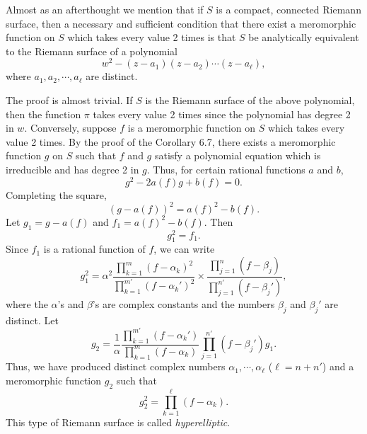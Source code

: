 \documentclass[a4paper,11pt]{article}
\begin{document}
Almost as an afterthought we mention that if $S$ is a compact,
connected Riemann surface, then a necessary and sufficient condition
that there exist a meromorphic function on $S$ which takes every value
2 times is that $S$ be analytically equivalent to the Riemann surface
of a polynomial
$$
w^2 - (z-a_1)(z-a_2) \cdots (z-a_\ell),
$$
where $a_1, a_2, \cdots, a_\ell$ are distinct.

The proof is almost trivial.  If $S$ is the Riemann surface of the
above polynomial, then the function $\pi$ takes every value 2 times
since the polynomial has degree 2 in $w$.  Conversely, suppose $f$ is
a meromorphic function on $S$ which takes every value 2 times.  By the
proof of the Corollary 6.7, there exists a meromorphic function $g$ on
$S$ such that $f$ and $g$ satisfy a polynomial equation which is
irreducible and has degree 2 in $g$.  Thus, for certain rational
functions $a$ and $b$,
$$
g^2 - 2a(f)g + b(f) = 0.
$$
Completing the square,
$$
(g - a(f))^2 = a(f)^2 - b(f).
$$
Let $g_1 = g - a(f)$ and $f_1 = a(f)^2 - b(f)$.  Then
$$
g_1^2 = f_1.
$$
Since $f_1$ is a rational function of $f$, we can write
$$
g_1^2 = \alpha^2 \frac{\prod_{k=1}^m (f - \alpha_k)^2}{
  \prod_{k=1}^{m'} (f - \alpha_k')^2}
  \times \frac{\prod_{j=1}^n (f - \beta_j)}{
    \prod_{j=1}^{n'} (f - \beta_j')},
$$
where the $\alpha$'s and $\beta$'s are complex constants and the
numbers $\beta_j$ and $\beta_j'$ are distinct.  Let
$$
g_2 = \frac{1}{\alpha} \frac{\prod_{k=1}^{m'} (f - \alpha_k')}{
  \prod_{k=1}^{m} (f - \alpha_k)}
  \prod_{j=1}^{n'} (f - \beta_j') g_1.
$$
Thus, we have produced distinct complex numbers $\alpha_1, \cdots,
\alpha_\ell$ ($\ell = n + n'$) and a meromorphic function $g_2$ such
that
$$
g_2^2 = \prod_{k=1}^\ell (f - \alpha_k).
$$
This type of Riemann surface is called \emph{hyperelliptic}.
\end{document}
